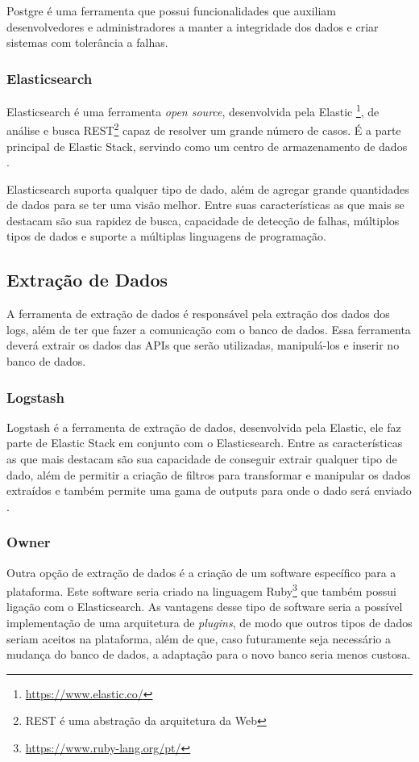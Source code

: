 Postgre é uma ferramenta que possui funcionalidades que auxiliam desenvolvedores e administradores a manter a integridade dos dados e criar sistemas com tolerância a falhas.
\subsubsection*{Elasticsearch}
Elasticsearch é uma ferramenta \textit{open source}, desenvolvida pela Elastic \footnote[1]{\url{https://www.elastic.co/}}, de análise e busca REST\footnote[2]{REST é uma abstração da arquitetura da Web} capaz de resolver um grande número de casos. É a parte principal de Elastic Stack, servindo como um centro de armazenamento de dados \cite{elasticsearch}.

Elasticsearch suporta qualquer tipo de dado, além de agregar grande quantidades de dados para se ter uma visão melhor. Entre suas características as que mais se destacam são sua rapidez de busca, capacidade de detecção de falhas, múltiplos tipos de dados e suporte a múltiplas linguagens de programação.
\subsection{Extração de Dados}
A ferramenta de extração de dados é responsável pela extração dos dados dos logs, além de ter que fazer a comunicação com o banco de dados. Essa ferramenta deverá extrair os dados das APIs que serão utilizadas, manipulá-los e inserir no banco de dados.
\subsubsection*{Logstash}
Logstash é a ferramenta de extração de dados, desenvolvida pela Elastic, ele faz parte de Elastic Stack em conjunto com o Elasticsearch. Entre as características as que mais destacam são sua capacidade de conseguir extrair qualquer tipo de dado, além de permitir a criação de filtros para transformar e manipular os dados extraídos e também permite uma gama de outputs para onde o dado será enviado \cite{logstash}.
\subsubsection*{Owner}
Outra opção de extração de dados é a criação de um software específico para a plataforma. Este software seria criado na linguagem Ruby\footnote[3]{\url{https://www.ruby-lang.org/pt/}} que também possui ligação com o Elasticsearch. As vantagens desse tipo de software seria a possível implementação de uma arquitetura de \textit{plugins}, de modo que outros tipos de dados seriam aceitos na plataforma, além de que, caso futuramente seja necessário a mudança do banco de dados, a adaptação para o novo banco seria menos custosa.
